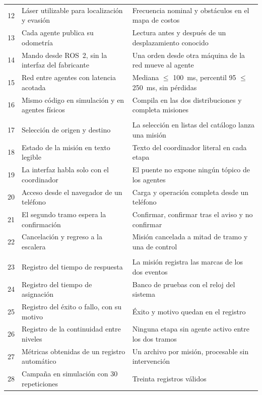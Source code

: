 \begin{table}[H]
\begin{tabular}{@{}c>{\raggedright\arraybackslash}p{}>{\raggedright\arraybackslash}p{}@{}}
    12 & Láser utilizable para localización y evasión & Frecuencia nominal y obstáculos en el mapa de costos \\
    13 & Cada agente publica su odometría & Lectura antes y después de un desplazamiento conocido \\
    14 & Mando desde ROS~2, sin la interfaz del fabricante & Una orden desde otra máquina de la red mueve al agente \\
    15 & Red entre agentes con latencia acotada & Mediana $\leq$ 100~ms, percentil 95 $\leq$ 250~ms, sin pérdidas \\
    16 & Mismo código en simulación y en agentes físicos & Compila en las dos distribuciones y completa misiones \\ \addlinespace
    \multicolumn{3}{@{}l}{\textit{Tercer objetivo específico: interfaz móvil}} \\
    17 & Selección de origen y destino & La selección en listas del catálogo lanza una misión \\
    18 & Estado de la misión en texto legible & Texto del coordinador literal en cada etapa \\
    19 & La interfaz habla solo con el coordinador & El puente no expone ningún tópico de los agentes \\
    20 & Acceso desde el navegador de un teléfono & Carga y operación completa desde un teléfono \\
    21 & El segundo tramo espera la confirmación & Confirmar, confirmar tras el aviso y no confirmar \\
    22 & Cancelación y regreso a la escalera & Misión cancelada a mitad de tramo y una de control \\ \addlinespace
    \multicolumn{3}{@{}l}{\textit{Cuarto objetivo específico: evaluación experimental}} \\
    23 & Registro del tiempo de respuesta & La misión registra las marcas de los dos eventos \\
    24 & Registro del tiempo de asignación & Banco de pruebas con el reloj del sistema \\
    25 & Registro del éxito o fallo, con su motivo & Éxito y motivo quedan en el registro \\
    26 & Registro de la continuidad entre niveles & Ninguna etapa sin agente activo entre los dos tramos \\
    27 & Métricas obtenidas de un registro automático & Un archivo por misión, procesable sin intervención \\
    28 & Campaña en simulación con 30 repeticiones & Treinta registros válidos \\

\end{tabular}
\end{table}
